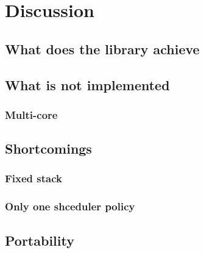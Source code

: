 
\chapter{Discussion}
\label{ch:discussion}


\section{What does the library achieve}
\section{What is not implemented}
\subsection{Multi-core}
\section{Shortcomings}
\subsection{Fixed stack}
\subsection{Only one shceduler policy}
\section{Portability}
\label{sec:portability}